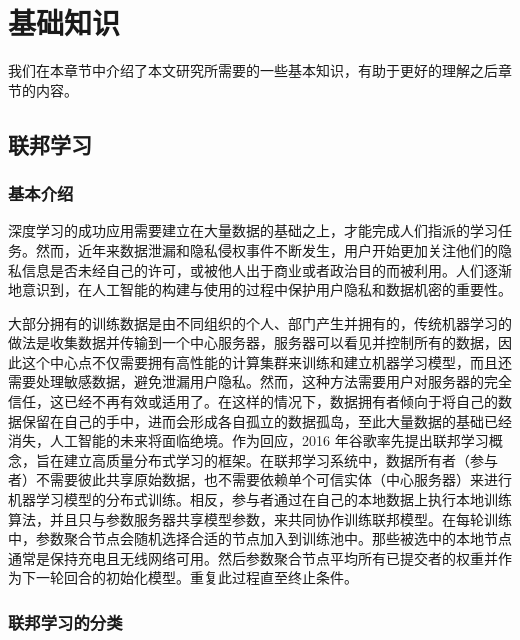 \chapter{基础知识}
\label{ch2}
我们在本章节中介绍了本文研究所需要的一些基本知识，有助于更好的理解之后章节的内容。

\section{联邦学习}

\subsection{基本介绍}
深度学习的成功应用需要建立在大量数据的基础之上，才能完成人们指派的学习任务。然而，近年来数据泄漏和隐私侵权事件不断发生，用户开始更加关注他们的隐私信息是否未经自己的许可，或被他人出于商业或者政治目的而被利用。人们逐渐地意识到，在人工智能的构建与使用的过程中保护用户隐私和数据机密的重要性。

大部分拥有的训练数据是由不同组织的个人、部门产生并拥有的，传统机器学习的做法是收集数据并传输到一个中心服务器，服务器可以看见并控制所有的数据，因此这个中心点不仅需要拥有高性能的计算集群来训练和建立机器学习模型，而且还需要处理敏感数据，避免泄漏用户隐私。然而，这种方法需要用户对服务器的完全信任，这已经不再有效或适用了。在这样的情况下，数据拥有者倾向于将自己的数据保留在自己的手中，进而会形成各自孤立的数据孤岛，至此大量数据的基础已经消失，人工智能的未来将面临绝境。作为回应，2016 年谷歌率先提出联邦学习概念，旨在建立高质量分布式学习的框架。在联邦学习系统中，数据所有者（参与者）不需要彼此共享原始数据，也不需要依赖单个可信实体（中心服务器）来进行机器学习模型的分布式训练。相反，参与者通过在自己的本地数据上执行本地训练算法，并且只与参数服务器共享模型参数，来共同协作训练联邦模型。在每轮训练中，参数聚合节点会随机选择合适的节点加入到训练池中。那些被选中的本地节点通常是保持充电且无线网络可用。然后参数聚合节点平均所有已提交者的权重并作为下一轮回合的初始化模型。重复此过程直至终止条件。

\subsection{联邦学习的分类}


